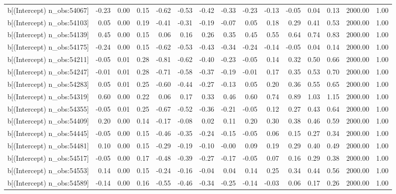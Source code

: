 \begin{table}[ht]
\begin{tabular}{rrrrrrrrrrrrrrr}
  b[(Intercept) n\_obs:54067] & -0.23 & 0.00 & 0.15 & -0.62 & -0.53 & -0.42 & -0.33 & -0.23 & -0.13 & -0.05 & 0.04 & 0.13 & 2000.00 & 1.00 \\ 
  b[(Intercept) n\_obs:54103] & 0.05 & 0.00 & 0.19 & -0.41 & -0.31 & -0.19 & -0.07 & 0.05 & 0.18 & 0.29 & 0.41 & 0.53 & 2000.00 & 1.00 \\ 
  b[(Intercept) n\_obs:54139] & 0.45 & 0.00 & 0.15 & 0.06 & 0.16 & 0.26 & 0.35 & 0.45 & 0.55 & 0.64 & 0.74 & 0.83 & 2000.00 & 1.00 \\ 
  b[(Intercept) n\_obs:54175] & -0.24 & 0.00 & 0.15 & -0.62 & -0.53 & -0.43 & -0.34 & -0.24 & -0.14 & -0.05 & 0.04 & 0.14 & 2000.00 & 1.00 \\ 
  b[(Intercept) n\_obs:54211] & -0.05 & 0.01 & 0.28 & -0.81 & -0.62 & -0.40 & -0.23 & -0.05 & 0.14 & 0.32 & 0.50 & 0.66 & 2000.00 & 1.00 \\ 
  b[(Intercept) n\_obs:54247] & -0.01 & 0.01 & 0.28 & -0.71 & -0.58 & -0.37 & -0.19 & -0.01 & 0.17 & 0.35 & 0.53 & 0.70 & 2000.00 & 1.00 \\ 
  b[(Intercept) n\_obs:54283] & 0.05 & 0.01 & 0.25 & -0.60 & -0.44 & -0.27 & -0.13 & 0.05 & 0.20 & 0.36 & 0.55 & 0.65 & 2000.00 & 1.00 \\ 
  b[(Intercept) n\_obs:54319] & 0.60 & 0.00 & 0.22 & 0.06 & 0.17 & 0.33 & 0.46 & 0.60 & 0.74 & 0.89 & 1.03 & 1.15 & 2000.00 & 1.00 \\ 
  b[(Intercept) n\_obs:54355] & -0.05 & 0.01 & 0.25 & -0.67 & -0.52 & -0.36 & -0.21 & -0.05 & 0.12 & 0.27 & 0.43 & 0.64 & 2000.00 & 1.00 \\ 
  b[(Intercept) n\_obs:54409] & 0.20 & 0.00 & 0.14 & -0.17 & -0.08 & 0.02 & 0.11 & 0.20 & 0.30 & 0.38 & 0.46 & 0.59 & 2000.00 & 1.00 \\ 
  b[(Intercept) n\_obs:54445] & -0.05 & 0.00 & 0.15 & -0.46 & -0.35 & -0.24 & -0.15 & -0.05 & 0.06 & 0.15 & 0.27 & 0.34 & 2000.00 & 1.00 \\ 
  b[(Intercept) n\_obs:54481] & 0.10 & 0.00 & 0.15 & -0.29 & -0.19 & -0.10 & -0.00 & 0.09 & 0.19 & 0.29 & 0.40 & 0.49 & 2000.00 & 1.00 \\ 
  b[(Intercept) n\_obs:54517] & -0.05 & 0.00 & 0.17 & -0.48 & -0.39 & -0.27 & -0.17 & -0.05 & 0.07 & 0.16 & 0.29 & 0.38 & 2000.00 & 1.00 \\ 
  b[(Intercept) n\_obs:54553] & 0.14 & 0.00 & 0.15 & -0.24 & -0.16 & -0.04 & 0.04 & 0.14 & 0.25 & 0.34 & 0.44 & 0.56 & 2000.00 & 1.00 \\ 
  b[(Intercept) n\_obs:54589] & -0.14 & 0.00 & 0.16 & -0.55 & -0.46 & -0.34 & -0.25 & -0.14 & -0.03 & 0.06 & 0.17 & 0.26 & 2000.00 & 1.00 \\ 

\end{tabular}
\end{table}
